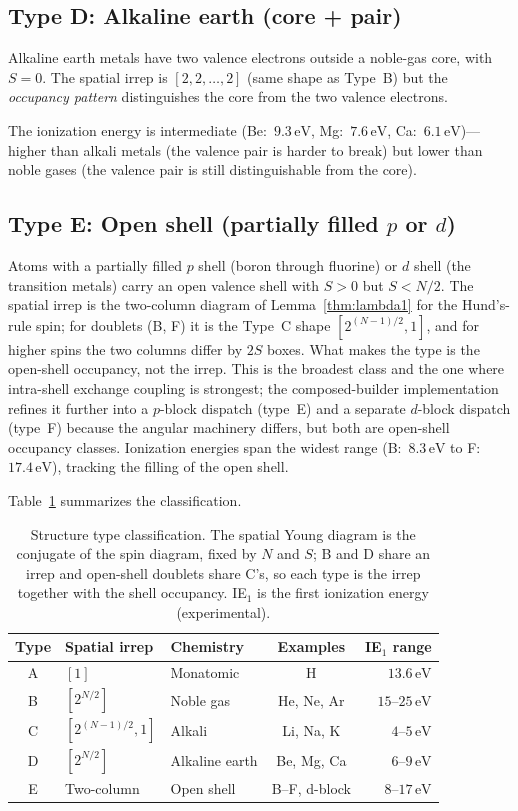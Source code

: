 \documentclass[aps,prl,twocolumn,superscriptaddress,longbibliography]{revtex4-2}
\newcommand{\eV}{\,\mathrm{eV}}
\begin{document}
\subsection{Type D: Alkaline earth (core + pair)}

Alkaline earth metals have two valence electrons outside a noble-gas
core, with $S = 0$.  The spatial irrep is $[2, 2, \ldots, 2]$ (same
shape as Type~B) but the \emph{occupancy pattern} distinguishes the
core from the two valence electrons.

The ionization energy is intermediate (Be:~$9.3\eV$, Mg:~$7.6\eV$,
Ca:~$6.1\eV$)---higher than alkali metals (the valence pair is harder
to break) but lower than noble gases (the valence pair is still
distinguishable from the core).

\subsection{Type E: Open shell (partially filled $p$ or $d$)}

Atoms with a partially filled $p$ shell (boron through fluorine) or
$d$ shell (the transition metals) carry an open valence shell with
$S > 0$ but $S < N/2$.  The spatial irrep is the two-column diagram of
Lemma~\ref{thm:lambda1} for the Hund's-rule spin; for doublets (B, F)
it is the Type~C shape $[2^{(N-1)/2},1]$, and for higher spins the two
columns differ by $2S$ boxes.  What makes the type is the open-shell
occupancy, not the irrep.  This is the
broadest class and the one where intra-shell exchange coupling is
strongest; the composed-builder implementation refines it further into
a $p$-block dispatch (type~E) and a separate $d$-block dispatch
(type~F) because the angular machinery differs, but both are
open-shell occupancy classes.  Ionization energies span the widest range
(B:~$8.3\eV$ to F:~$17.4\eV$), tracking the filling of the open shell.

Table~\ref{tab:types} summarizes the classification.

\begin{table}[h]
\centering
\caption{Structure type classification.  The spatial Young diagram is
the conjugate of the spin diagram, fixed by $N$ and $S$; B and D share
an irrep and open-shell doublets share C's, so each type is the irrep
together with the shell occupancy.  IE$_1$ is the first ionization
energy (experimental).}
\label{tab:types}
\begin{tabular}{cllcr}
\toprule
Type & Spatial irrep & Chemistry & Examples & IE$_1$ range \\
\midrule
A & $[1]$       & Monatomic       & H            & $13.6\eV$ \\
B & $[2^{N/2}]$ & Noble gas       & He, Ne, Ar   & $15$--$25\eV$ \\
C & $[2^{(N-1)/2}, 1]$ & Alkali  & Li, Na, K    & $4$--$5\eV$ \\
D & $[2^{N/2}]$ & Alkaline earth  & Be, Mg, Ca   & $6$--$9\eV$ \\
E & Two-column  & Open shell      & B--F, d-block& $8$--$17\eV$ \\
\bottomrule
\end{tabular}
\end{table}
\end{document}
